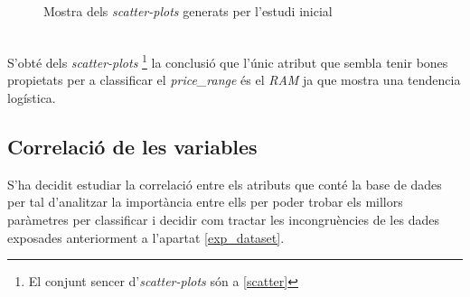\documentclass[a4paper, 11pt]{article}
\begin{document}
\begin{figure}[h]
    \centering
    \caption{Mostra dels \textit{scatter-plots} generats per l'estudi inicial}
\end{figure}\\
\hspace{-1.4 em}S'obté dels \textit{scatter-plots} \footnote{El conjunt sencer d'\textit{scatter-plots} són a \textcolor{blue}{\ref{scatter}}} la conclusió que l'únic atribut que sembla tenir bones propietats per a classificar el \textit{price\_range} és el \textit{RAM} ja que mostra una tendencia logística.\\
\newpage
\subsection{Correlació de les variables}\label{correlacio}
S'ha decidit estudiar la correlació entre els atributs que conté la base de dades per tal d'analitzar la importància entre ells per poder trobar els millors paràmetres per classificar i decidir com tractar les incongruències de les dades exposades anteriorment a l'apartat \textcolor{blue}{\ref{exp_dataset}}.
\end{document}
